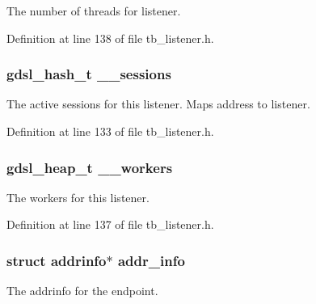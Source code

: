 The number of threads for listener. 



Definition at line 138 of file tb\-\_\-listener.\-h.

\hypertarget{structtb__listener__t_a297b6218401cf4b88bf011d2665be0d2}{
\subsubsection[{\-\_\-\-\_\-sessions}]{\setlength{\rightskip}{0pt plus 5cm}gdsl\-\_\-hash\-\_\-t \-\_\-\-\_\-sessions}}\label{structtb__listener__t_a297b6218401cf4b88bf011d2665be0d2}
The active sessions for this listener. Maps address to listener. 

Definition at line 133 of file tb\-\_\-listener.\-h.

\hypertarget{structtb__listener__t_a41b2b73dc00fee2a18f90afa4987cc5b}{
\subsubsection[{\-\_\-\-\_\-workers}]{\setlength{\rightskip}{0pt plus 5cm}gdsl\-\_\-heap\-\_\-t \-\_\-\-\_\-workers}}\label{structtb__listener__t_a41b2b73dc00fee2a18f90afa4987cc5b}


The workers for this listener. 



Definition at line 137 of file tb\-\_\-listener.\-h.

\hypertarget{structtb__listener__t_aab742bc33815bd69bf49ad1861006b97}{
\subsubsection[{addr\-\_\-info}]{\setlength{\rightskip}{0pt plus 5cm}struct addrinfo$\ast$ addr\-\_\-info}}\label{structtb__listener__t_aab742bc33815bd69bf49ad1861006b97}


The addrinfo for the endpoint. 



